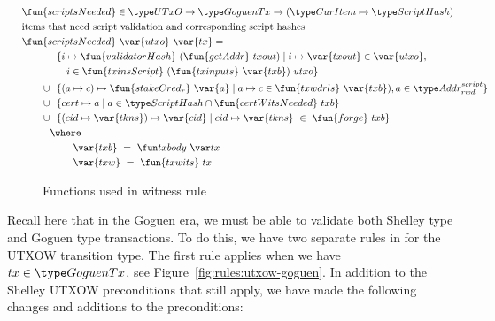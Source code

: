 \begin{figure}[htb]
  \begin{align*}
      & \hspace{-1cm}\fun{scriptsNeeded} \in \UTxO \to \GoguenTx \to
        (\CurItem \mapsto \ScriptHash)\\
      & \hspace{-1cm}\text{items that need script validation and corresponding script hashes} \\
      &  \hspace{-1cm}\fun{scriptsNeeded}~\var{utxo}~\var{tx} = \\
      & ~~\{ i \mapsto \fun{validatorHash}~(\fun{getAddr}~{txout}) \mid i \mapsto \var{txout} \in \var{utxo},\\
      & ~~~~~i\in\fun{txinsScript}~{(\fun{txinputs}~\var{txb})}~{utxo}\} \\
      \cup & ~~\{ (a\mapsto c) \mapsto \fun{stakeCred_{r}}~\var{a} \mid a \mapsto c \in \fun{txwdrls}~\var{txb}),
         a\in \AddrRWDScr \} \\
        \cup & ~~\{ cert \mapsto a \mid a \in\ScriptHash \cap \fun{certWitsNeeded}~{txb}\} \\
        \cup & ~~\{ (cid \mapsto \var{tkns}) \mapsto \var{cid} \mid cid \mapsto \var{tkns}~\in~\fun{forge}~{txb} \} \\
      & \where \\
      & ~~~~~~~ \var{txb}~=~\txbody{tx} \\
      & ~~~~~~~ \var{txw}~=~\fun{txwits}~{tx}
  \end{align*}
  \caption{Functions used in witness rule}
  \label{fig:functions-witnesses}
\end{figure}

Recall here that in the Goguen era, we must be able to validate both Shelley type
and Goguen type transactions. To do this, we have two separate rules in for the
UTXOW transition type. The first rule applies when we have $tx \in \GoguenTx$, see
Figure~\ref{fig:rules:utxow-goguen}. In addition to the Shelley UTXOW preconditions
that still apply, we have made the following changes and additions to the
preconditions:


